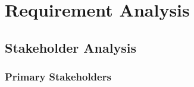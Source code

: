 
\newcommand{\userstory}[4]{%
    \refstepcounter{nuserstory}
    \subsection{#1}
    \label{userstory:\thenuserstory}
    \hangindent=40pt
    \textbf{\textit{As a}} #2,\\
    \textbf{\textit{I want to}} #3,\\
    \textbf{\textit{so that}} #4.
}
\newenvironment{usecase}[1]
{
    \refstepcounter{nusecase}%
    \subsection{Use Case \thenusecase: #1}%
    \label{usecase:\thenusecase}%
}{}


\chapter{Requirement Analysis}
\label{chap:requirement-analysis}

\section{Stakeholder Analysis}
\label{section:stakeholder-analysis}

\subsection{Primary Stakeholders}
\label{subsection:primary-stakeholders}

